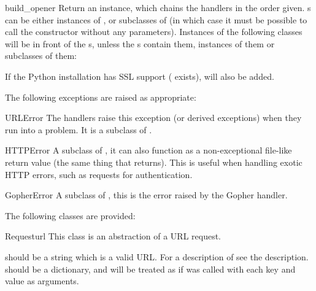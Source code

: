 \begin{funcdesc}{build_opener}{}
Return an  instance, which chains the
handlers in the order given. s can be either instances
of , or subclasses of  (in
which case it must be possible to call the constructor without
any parameters).  Instances of the following classes will be in
front of the s, unless the s contain
them, instances of them or subclasses of them:


If the Python installation has SSL support (
exists),  will also be added.
\end{funcdesc}


The following exceptions are raised as appropriate:

\begin{excdesc}{URLError}
The handlers raise this exception (or derived exceptions) when they
run into a problem.  It is a subclass of .
\end{excdesc}

\begin{excdesc}{HTTPError}
A subclass of , it can also function as a 
non-exceptional file-like return value (the same thing that
 returns).  This is useful when handling exotic
HTTP errors, such as requests for authentication.
\end{excdesc}

\begin{excdesc}{GopherError}
A subclass of , this is the error raised by the
Gopher handler.
\end{excdesc}


The following classes are provided:

\begin{classdesc}{Request}{url}
This class is an abstraction of a URL request.

 should be a string which is a valid URL.  For a description
of  see the  description.
 should be a dictionary, and will be treated as if
 was called with each key and value as arguments.
\end{classdesc}

